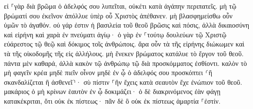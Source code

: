 \documentclass{openreader}
\begin{document}
εἰ ⸀γὰρ διὰ βρῶμα ὁ ἀδελφός σου λυπεῖται, οὐκέτι κατὰ ἀγάπην περιπατεῖς. μὴ τῷ βρώματί σου ἐκεῖνον ἀπόλλυε ὑπὲρ οὗ Χριστὸς ἀπέθανεν. 
μὴ βλασφημείσθω οὖν ὑμῶν τὸ ἀγαθόν. 
οὐ γάρ ἐστιν ἡ βασιλεία τοῦ θεοῦ βρῶσις καὶ πόσις, ἀλλὰ δικαιοσύνη καὶ εἰρήνη καὶ χαρὰ ἐν πνεύματι ἁγίῳ· 
ὁ γὰρ ἐν ⸀τούτῳ δουλεύων τῷ Χριστῷ εὐάρεστος τῷ θεῷ καὶ δόκιμος τοῖς ἀνθρώποις. 
ἄρα οὖν τὰ τῆς εἰρήνης διώκωμεν καὶ τὰ τῆς οἰκοδομῆς τῆς εἰς ἀλλήλους. 
μὴ ἕνεκεν βρώματος κατάλυε τὸ ἔργον τοῦ θεοῦ. πάντα μὲν καθαρά, ἀλλὰ κακὸν τῷ ἀνθρώπῳ τῷ διὰ προσκόμματος ἐσθίοντι. 
καλὸν τὸ μὴ φαγεῖν κρέα μηδὲ πιεῖν οἶνον μηδὲ ἐν ᾧ ὁ ἀδελφός σου προσκόπτει ⸂ἢ σκανδαλίζεται ἢ ἀσθενεῖ⸃· 
σὺ πίστιν ⸀ἣν ἔχεις κατὰ σεαυτὸν ἔχε ἐνώπιον τοῦ θεοῦ. μακάριος ὁ μὴ κρίνων ἑαυτὸν ἐν ᾧ δοκιμάζει· 
ὁ δὲ διακρινόμενος ἐὰν φάγῃ κατακέκριται, ὅτι οὐκ ἐκ πίστεως· πᾶν δὲ ὃ οὐκ ἐκ πίστεως ἁμαρτία ⸀ἐστίν. 
\end{document}
